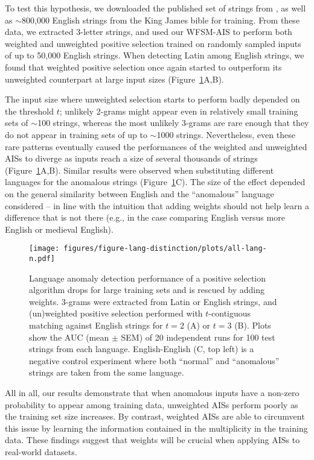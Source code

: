 \documentclass{llncs}
\begin{document}
To test this hypothesis, we downloaded the published set of strings from \cite{Wortel2020t}, 
as well as $\sim$800,000 English strings from the King James bible for training.
From these data, we extracted 3-letter strings, and used our WFSM-AIS to perform both weighted 
and unweighted positive selection trained on randomly sampled inputs of up to 50,000 English 
 strings. When detecting Latin among English strings, we found that weighted 
positive selection once again started to outperform
its unweighted counterpart at large input sizes (Figure~\ref{figurelang}A,B). 

The input size where unweighted selection starts to perform badly depended on the 
threshold $t$; unlikely 2-grams might appear even in 
relatively small training sets of $\sim$100 strings, whereas the most unlikely 3-grams 
are rare enough that they do not appear in training sets of up to $\sim$1000 strings.
Nevertheless, even these rare patterns eventually caused the performances of the 
weighted and unweighted AISs to 
diverge as inputs reach a size of several thousands of strings (Figure~\ref{figurelang}A,B). 
Similar results were observed when substituting different languages for the 
anomalous strings (Figure~\ref{figurelang}C). The size of the effect depended on the 
general similarity between English and the ``anomalous'' language considered -- in line
with the intuition that adding weights should not help learn a difference that is not 
there (e.g., in the case comparing English versus more English or 
medieval English).

\begin{figure}
  \centering
   \texttt{[image: figures/figure-lang-distinction/plots/all-lang-n.pdf]}
   \caption{ 
   Language anomaly detection performance of a positive selection algorithm drops for 
   large training sets and is rescued by adding weights. 3-grams were extracted from 
   Latin or English strings, and (un)weighted positive selection performed  with 
   $t$-contiguous matching against English strings for  $t=2$ (A) or $t=3$ (B). 
   Plots show the AUC (mean $\pm$ SEM) of 20 independent runs for 100 test strings 
   from each language. 	English-English (C, top left) is a negative control experiment 
	where both ``normal'' and ``anomalous''
	strings are taken from the same language.
  }
  \label{figurelang}
\end{figure}

All in all, our results demonstrate that when anomalous inputs have a non-zero probability
to appear among training data, unweighted AISs perform poorly as the training set size 
increases. By contrast, weighted AISs are able to circumvent this issue by learning 
the information contained in the multiplicity in the training data. These findings 
suggest that weights will be crucial when applying AISs to real-world datasets.
\end{document}
